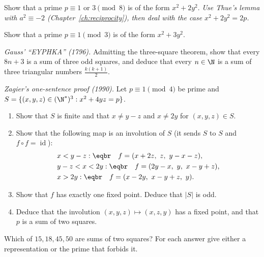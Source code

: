 \begin{exercise}[$\star\star$]\label{ex:x2y2}
Show that a prime $p\equiv1$ or $3\pmod8$ is of the form $x^2+2y^2$. \emph{Use Thue's lemma with $a^2\equiv-2$ (Chapter~\ref{ch:reciprocity}), then deal with the case $x^2+2y^2=2p$.}
\end{exercise}

\begin{exercise}[$\star\star$]\label{ex:x3y2}
Show that a prime $p\equiv1\pmod3$ is of the form $x^2+3y^2$.
\end{exercise}

\begin{exercise}[$\star\star$]\label{ex:eureka}
\emph{Gauss' ``E\upshape{}YPHKA'' (1796).} Admitting the three-square theorem, show that every $8n+3$ is a sum of three odd squares, and deduce that every $n\in\N$ is a sum of three triangular numbers $\frac{k(k+1)}2$.
\end{exercise}

\begin{exercise}[$\star\star\star$]\label{ex:zagier}
\emph{Zagier's one-sentence proof (1990).} Let $p\equiv1\pmod4$ be prime and $S=\{(x,y,z)\in(\N^*)^3:x^2+4yz=p\}$.
\begin{enumerate}[label=(\alph*)]
\item Show that $S$ is finite and that $x\ne y-z$ and $x\ne2y$ for $(x,y,z)\in S$.
\item Show that the following map is an involution of $S$ (it sends $S$ to $S$ and $f\circ f=\operatorname{id}$):
\[
\begin{aligned}&x<y-z:\eqbr\quad f=(x+2z,\ z,\ y-x-z),\\&y-z<x<2y:\eqbr\quad f=(2y-x,\ y,\ x-y+z),\\&x>2y:\eqbr\quad f=(x-2y,\ x-y+z,\ y).\end{aligned}
\]
\item Show that $f$ has exactly one fixed point. Deduce that $|S|$ is odd.
\item Deduce that the involution $(x,y,z)\mapsto(x,z,y)$ has a fixed point, and that $p$ is a sum of two squares.
\end{enumerate}
\end{exercise}

\begin{exercise}[$\star$]\label{ex:t1-which20}
Which of $15,18,45,50$ are sums of two squares? For each answer give either a representation or the prime that forbids it.
\end{exercise}

